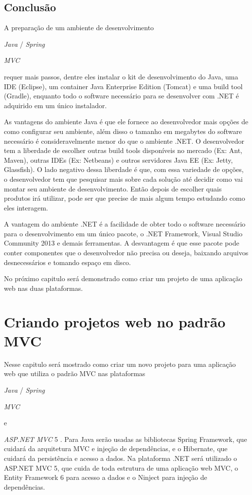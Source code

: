 \documentclass[a4paper,12pt]{article}
\newcommand{\anmvc} {
\sigla{ASP.NET MVC} 5
}
\newcommand{\spring} {
\lang{Java}/\est{Spring} \sigla{MVC}
}
\newcommand{\est}[1] {
	\textit{#1}
}
\newcommand{\sigla}[1] {
	\textit{#1}
}
\newcommand{\lang}[1] {
	\textit{#1}
}
\begin{document}
\subsection{Conclusão}

A preparação de um ambiente de desenvolvimento \spring requer mais passos, dentre eles instalar o kit de desenvolvimento do Java, uma IDE (Eclipse), um container Java Enterprise Edition (Tomcat) e uma build tool (Gradle), enquanto  todo o software necessário para se desenvolver com .NET é adquirido em um único instalador.

As vantagens do ambiente Java é que ele fornece ao desenvolvedor mais opções de como configurar seu ambiente, além disso o tamanho em megabytes do software necessário é consideravelmente menor do que o ambiente .NET. O desenvolvedor tem a liberdade de escolher outras build tools disponíveis no mercado (Ex: Ant, Maven), outras IDEs (Ex: Netbeans) e outros servidores Java EE (Ex: Jetty, Glassfish). O lado negativo dessa liberdade é que, com  essa variedade de opções, o desenvolvedor tem que pesquisar mais sobre cada solução até decidir como vai montar seu ambiente de desenvolvimento. Então depois de escolher quais produtos irá utilizar, pode ser que precise de mais algum tempo estudando como eles interagem.

A vantagem do ambiente .NET é a facilidade de obter todo o software necessário para o desenvolvimento em um único pacote, o .NET Framework, Visual Studio Community 2013 e demais ferramentas. A desvantagem é que esse pacote pode conter componentes que o desenvolvedor não precisa ou deseja, baixando arquivos desnecessários e tomando espaço em disco.

No próximo capitulo será demonstrado como criar um projeto de uma aplicação web nas duas plataformas.

\newpage
\section{Criando projetos web no padrão MVC}

Nesse capitulo será mostrado como criar um novo projeto para uma aplicação web que utiliza o padrão MVC nas plataformas \spring e \anmvc. Para Java serão usadas as bibliotecas Spring Framework, que cuidará da arquitetura MVC e injeção de dependências, e o Hibernate, que cuidará da persistência e acesso a dados. Na plataforma .NET será utilizado o ASP.NET MVC 5, que cuida de toda estrutura de uma aplicação web MVC, o Entity Framework 6 para acesso a dados e o Ninject para injeção de dependências.
\end{document}
